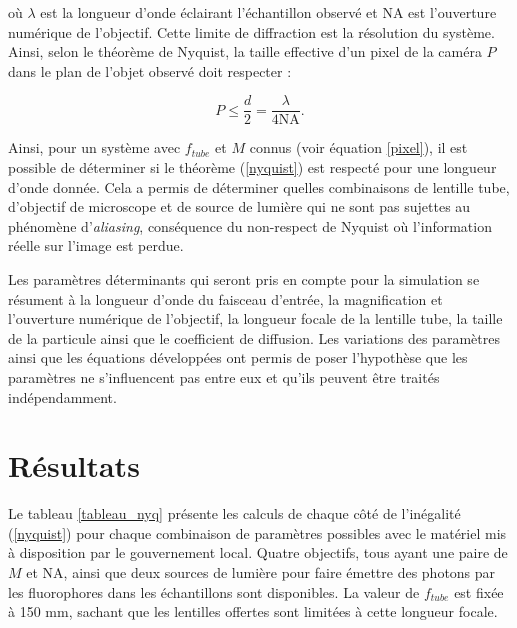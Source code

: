 \documentclass[conference]{IEEEtran}
\begin{document}
où $\lambda$ est la longueur d'onde éclairant l'échantillon observé et NA est l'ouverture numérique de
l'objectif. Cette limite de diffraction est la résolution du système. Ainsi, selon le théorème
de Nyquist, la taille effective d'un pixel de la caméra $P$ dans le plan de l'objet observé doit respecter :

\begin{equation}\label{nyquist}
  P \leq \frac{d}{2} = \frac{\lambda}{4 \text{NA} }.
\end{equation}


Ainsi, pour un système avec $f_{tube}$ et $M$ connus (voir équation \ref{pixel}), il est possible de déterminer si le théorème 
(\ref{nyquist}) est respecté pour une longueur d'onde donnée. Cela a permis de déterminer quelles 
combinaisons de lentille tube, d'objectif de microscope et de source de lumière qui ne sont pas 
sujettes au phénomène d'\textit{aliasing}, conséquence du non-respect de Nyquist où l'information
réelle sur l'image est perdue.

Les paramètres déterminants qui seront pris en compte pour la simulation se résument à la longueur d'onde du faisceau d'entrée,
la magnification et l'ouverture numérique de l'objectif, la longueur focale de la lentille tube, la taille de la particule ainsi que le 
coefficient de diffusion. Les variations des paramètres ainsi que les équations
développées ont permis de poser l'hypothèse que les paramètres ne s'influencent pas entre eux et qu'ils peuvent être traités indépendamment.




\section{Résultats \label{resultats}}
Le tableau \ref{tableau_nyq} présente les calculs de chaque côté de l'inégalité (\ref{nyquist}) pour
chaque combinaison de paramètres possibles avec le matériel mis à disposition par le gouvernement local.
Quatre objectifs, tous ayant une paire de $M$ et NA, ainsi que deux sources de lumière pour faire émettre
des photons par les fluorophores dans les échantillons sont disponibles. La valeur de $f_{tube}$ est fixée à 150 mm, sachant que les lentilles offertes sont limitées à cette longueur focale.
\end{document}
